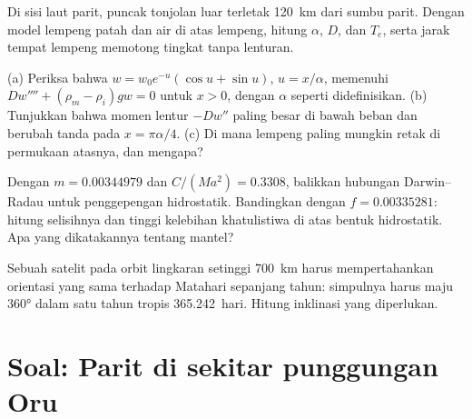 \begin{exercise}[$\star\star$]\label{exo:b3:gravity-geodesy:9}
Di sisi laut parit, puncak tonjolan luar terletak \qty{120}{km} dari
sumbu parit. Dengan model lempeng patah dan air di atas lempeng, hitung
$\alpha$, $D$, dan $T_e$, serta jarak tempat lempeng memotong tingkat tanpa
lenturan.
\end{exercise}

\begin{exercise}[$\star\star\star$]\label{exo:b3:gravity-geodesy:10}
(a) Periksa bahwa $w = w_0e^{-u}(\cos u + \sin u)$, $u = x/\alpha$, memenuhi
$Dw'''' + (\rho_m - \rho_i)gw = 0$ untuk $x > 0$, dengan $\alpha$ seperti didefinisikan.
(b) Tunjukkan bahwa momen lentur $-Dw''$ paling besar di bawah beban dan berubah
tanda pada $x = \pi\alpha/4$. (c) Di mana lempeng paling mungkin retak di
permukaan atasnya, dan mengapa?
\end{exercise}

\begin{exercise}[$\star\star\star$]\label{exo:b3:gravity-geodesy:11}
Dengan $m = \num{0.00344979}$ dan $C/(Ma^2) = \num{0.3308}$, balikkan
hubungan Darwin--Radau untuk penggepengan hidrostatik. Bandingkan dengan
$f = \num{0.00335281}$: hitung selisihnya dan tinggi kelebihan khatulistiwa
di atas bentuk hidrostatik. Apa yang dikatakannya tentang mantel?
\end{exercise}

\begin{exercise}[$\star\star\star$]\label{exo:b3:gravity-geodesy:12}
Sebuah satelit pada orbit lingkaran setinggi \qty{700}{km} harus mempertahankan
orientasi yang sama terhadap Matahari sepanjang tahun: simpulnya harus maju \ang{360} dalam
satu tahun tropis \num{365.242}~hari. Hitung inklinasi yang diperlukan.
\end{exercise}

\section{Soal: Parit di sekitar punggungan Oru}

